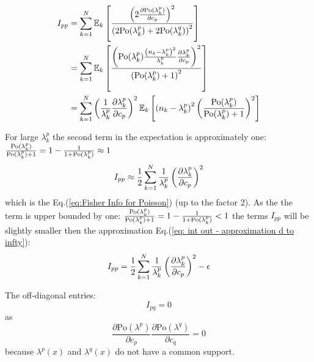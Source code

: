 \begin{alignat*}{1}
	I_{pp} & =\sum_{k=1}^{N}\mathbb{E}_{k}\left[\frac{\left(2\frac{\partial\textrm{Po}(\textrm{\ensuremath{\lambda}}_{k}^{p})}{\partial c_{p}}\right)^{2}}{\left(2\textrm{Po}(\lambda_{k}^{p})+2\textrm{Po}(\lambda_{k}^{q})\right)^{2}}\right]\\
	 & =\sum_{k=1}^{N}\mathbb{E}_{k}\left[\frac{\left(\textrm{Po}(\textrm{\ensuremath{\lambda}}_{k}^{p})\frac{\left(n_{k}-\lambda_{k}^{p}\right)^{2}}{\lambda_{k}^{p}}\frac{\partial\lambda_{k}^{p}}{\partial c_{p}}\right)^{2}}{\left(\textrm{Po}(\lambda_{k}^{p})+1\right)^{2}}\right]\\
	 & =\sum_{k=1}^{N}\left(\frac{1}{\lambda_{k}^{p}}\frac{\partial\textrm{\ensuremath{\lambda}}_{k}^{p}}{\partial c_{p}}\right)^{2}\mathbb{E}_{k}\left[\left(n_{k}-\lambda_{k}^{p}\right)^{2}\left(\frac{\textrm{Po}(\textrm{\ensuremath{\lambda}}_{k}^{p})}{\textrm{Po}(\textrm{\ensuremath{\lambda}}_{k}^{p})+1}\right)^{2}\right]
\end{alignat*}

For large $\lambda_{k}^{p}$ the second term in the expectation is approximately one: $\frac{\textrm{Po}(\textrm{\ensuremath{\lambda}}_{k}^{p})}{\textrm{Po}(\textrm{\ensuremath{\lambda}}_{k}^{p})+1}=1-\frac{1}{1+\textrm{Po}(\textrm{\ensuremath{\lambda}}_{k}^{p})}\approx1$
%
\begin{equation}
	I_{pp}\approx\frac{1}{2}\sum_{k=1}^{N}\frac{1}{\lambda_{k}^{p}}\left(\frac{\partial\textrm{\ensuremath{\lambda}}_{k}^{p}}{\partial c_{p}}\right)^{2}\label{eq: int out - approximation d to infty}
\end{equation}
%
which is the Eq.(\ref{eq:Fisher Info for Poisson}) (up to the factor 2). As the the term is upper bounded by one: $\frac{\textrm{Po}(\textrm{\ensuremath{\lambda}}_{k}^{p})}{\textrm{Po}(\textrm{\ensuremath{\lambda}}_{k}^{p})+1}=1-\frac{1}{1+\textrm{Po}(\textrm{\ensuremath{\lambda}}_{k}^{p})}<1$ the terms $ $$I_{pp}$ will be slightly smaller then the approximation Eq.(\ref{eq: int out - approximation d to infty}):
%
\begin{equation}
	I_{pp}=\frac{1}{2}\sum_{k=1}^{N}\frac{1}{\lambda_{k}^{p}}\left(\frac{\partial\textrm{\ensuremath{\lambda}}_{k}^{p}}{\partial c_{p}}\right)^{2}-\epsilon\label{eq:int out d to infty}
\end{equation}

The off-diagonal entries: 
%
\begin{equation}
	I_{pq}=0
\end{equation}
%
as
% 
\begin{equation}
	\frac{\partial\text{Po}(\lambda^{p})}{\partial c_{p}}\frac{\partial\text{Po}(\lambda^{q})}{\partial c_{q}}=0
\end{equation}
%
because $\lambda^{p}(x)$ and $\lambda^{q}(x)$ do not have a common support. 

